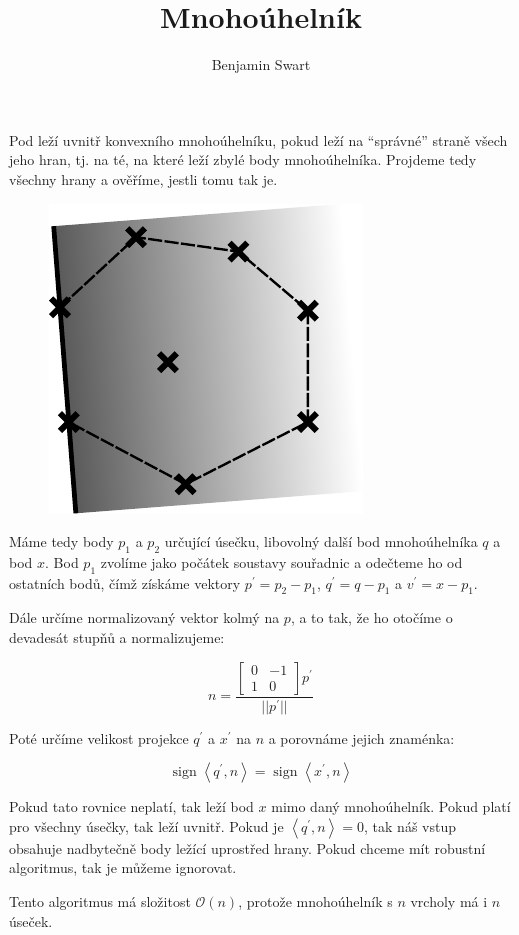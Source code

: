 \documentclass{article}
\title{Mnohoúhelník}
\author{Benjamin Swart}
\DeclareMathOperator{\sign}{sign}
\begin{document}
Pod leží uvnitř konvexního mnohoúhelníku, pokud leží na \enquote{správné} straně všech jeho hran, tj. na té, na které leží zbylé body mnohoúhelníka. Projdeme tedy všechny hrany a ověříme, jestli tomu tak je.

\begin{figure}[ht]
    \centering
    \includegraphics[scale=1.5]{polygon.pdf}
\end{figure}

Máme tedy body $p_1$ a $p_2$ určující úsečku, libovolný další bod mnohoúhelníka $q$ a bod $x$. Bod $p_1$ zvolíme jako počátek soustavy souřadnic a odečteme ho od ostatních bodů, čímž získáme vektory $p^\prime = p_2 - p_1$, $q^\prime = q - p_1$ a $v^\prime = x - p_1$.

Dále určíme normalizovaný vektor kolmý na $p$, a to tak, že ho otočíme o devadesát stupňů a normalizujeme:

\begin{equation*}
    n = \frac{
        \begin{bmatrix}
            0 & -1 \\
            1 & 0
        \end{bmatrix} p^\prime
    }{||p^\prime||}
\end{equation*}

Poté určíme velikost projekce $q^\prime$ a $x^\prime$ na $n$ a porovnáme jejich znaménka:

\begin{equation*}
    \sign{\left<q^\prime, n\right>} = \sign{\left<x^\prime, n\right>}
\end{equation*}

Pokud tato rovnice neplatí, tak leží bod $x$ mimo daný mnohoúhelník. Pokud platí pro všechny úsečky, tak leží uvnitř. Pokud je $\left<q^\prime, n\right> = 0$, tak náš vstup obsahuje nadbytečně body ležící uprostřed hrany. Pokud chceme mít robustní algoritmus, tak je můžeme ignorovat.

Tento algoritmus má složitost $\mathcal{O}\left(n\right)$, protože mnohoúhelník s $n$ vrcholy má i $n$ úseček.
\end{document}
